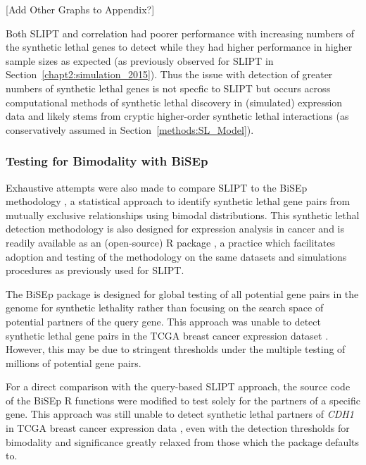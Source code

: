 [Add Other Graphs to Appendix?]


Both \gls{SLIPT} and correlation had poorer performance with increasing numbers of the synthetic lethal genes to detect while they had higher performance in higher sample sizes as expected (as previously observed for \gls{SLIPT} in Section~\ref{chapt2:simulation_2015}). Thus the issue with detection of greater numbers of synthetic lethal genes is not specfic to \gls{SLIPT} but occurs across computational methods of synthetic lethal discovery in (simulated) expression data and likely stems from cryptic higher-order synthetic lethal interactions (as conservatively assumed in Section~\ref{methods:SL_Model}). 
    
\FloatBarrier

\subsubsection{Testing for Bimodality with BiSEp}
\label{chap5:compare_bisep}

Exhaustive attempts were also made to compare \gls{SLIPT} to the \gls{BiSEp} methodology \citep{Wappett2016}, a statistical approach to identify synthetic lethal gene pairs from mutually exclusive relationships using bimodal distributions. This synthetic lethal detection methodology is also designed for expression analysis in cancer and is readily available as an (open-source) R package \citep{Wappett2014}, a practice which facilitates adoption and testing of the methodology on the same datasets and simulations procedures as previously used for \gls{SLIPT}.

The \gls{BiSEp} package is designed for global testing of all potential gene pairs in the genome for synthetic lethality rather than focusing on the search space of  potential partners of the query gene. This approach was unable to detect synthetic lethal gene pairs in the TCGA breast cancer expression dataset \citep{TCGA2012}. However, this may be due to stringent thresholds under the multiple testing of millions of potential gene pairs.

For a direct comparison with the query-based \gls{SLIPT} approach, the source code of the \gls{BiSEp} R functions were modified to test solely for the partners of a specific gene. This approach was still unable to detect synthetic lethal partners of \textit{CDH1} in TCGA breast cancer expression data \citep{TCGA2012}, even with the detection thresholds for bimodality and significance greatly relaxed from those which the package defaults to.

